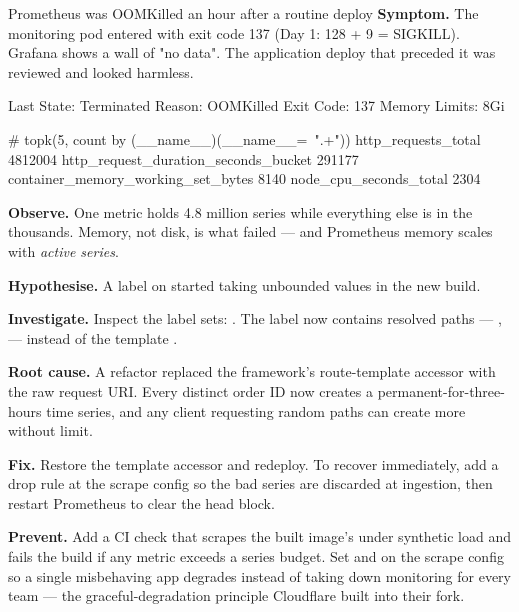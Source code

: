 \begin{debuglab}{Prometheus was OOMKilled an hour after a routine deploy}
\textbf{Symptom.} The monitoring pod entered  with exit code 137 (Day 1: 128 + 9 = SIGKILL). Grafana shows a wall of "no data". The application deploy that preceded it was reviewed and looked harmless.

\begin{outbox}
    Last State:   Terminated
      Reason:     OOMKilled
      Exit Code:  137
  Memory Limits:  8Gi

# topk(5, count by (__name__)({__name__=~".+"}))
http_requests_total                          4812004
http_request_duration_seconds_bucket          291177
container_memory_working_set_bytes              8140
node_cpu_seconds_total                          2304
\end{outbox}

\begin{tickcheck}
  \item \textbf{Observe.} One metric holds 4.8 million series while everything else is in the thousands. Memory, not disk, is what failed --- and Prometheus memory scales with \emph{active series}.
  \item \textbf{Hypothesise.} A label on  started taking unbounded values in the new build.
  \item \textbf{Investigate.} Inspect the label sets: . The  label now contains resolved paths --- ,  --- instead of the template .
  \item \textbf{Root cause.} A refactor replaced the framework's route-template accessor with the raw request URI. Every distinct order ID now creates a permanent-for-three-hours time series, and any client requesting random paths can create more without limit.
  \item \textbf{Fix.} Restore the template accessor and redeploy. To recover immediately, add a  drop rule at the scrape config so the bad series are discarded at ingestion, then restart Prometheus to clear the head block.
  \item \textbf{Prevent.} Add a CI check that scrapes the built image's  under synthetic load and fails the build if any metric exceeds a series budget. Set  and  on the scrape config so a single misbehaving app degrades instead of taking down monitoring for every team --- the graceful-degradation principle Cloudflare built into their fork.
\end{tickcheck}
\end{debuglab}

